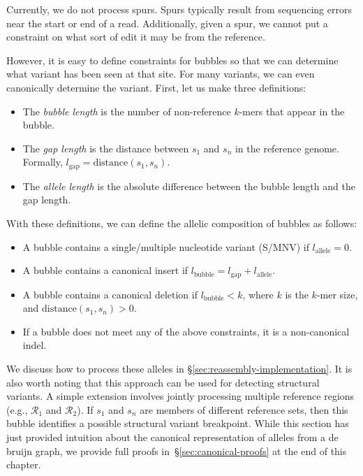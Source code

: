 \documentclass[masters]{ucbthesis}
\begin{document}
Currently, we do not process spurs. Spurs typically result from sequencing errors near the
start or end of a read. Additionally, given a spur, we cannot put a constraint on what sort of
edit it may be from the reference.

However, it is easy to define constraints for bubbles so that we can determine what variant
has been seen at that site. For many variants, we can even canonically determine the variant.
First, let us make three definitions:

\begin{itemize}
\item The \emph{bubble length} is the number of non-reference $k$-mers that appear in the bubble.
\item The \emph{gap length} is the distance between $s_1$ and $s_n$ in the reference genome. Formally,
$l_{\text{gap}} = \text{distance}(s_1, s_n)$.
\item The \emph{allele length} is the absolute difference between the bubble length and the gap length.
\end{itemize}

With these definitions, we can define the allelic composition of bubbles as follows:

\begin{itemize}
\item A bubble contains a single/multiple nucleotide variant (S/MNV) if $l_{\text{allele}} = 0$.
\item A bubble contains a canonical insert if $l_{\text{bubble}} = l_{\text{gap}} + l_{\text{allele}}$.
\item A bubble contains a canonical deletion if $l_{\text{bubble}} < k$, where $k$ is the $k$-mer size,
and $\text{distance}(s_1, s_n) > 0$.
\item If a bubble does not meet any of the above constraints, it is a non-canonical indel.
\end{itemize}

We discuss how to process these alleles in \S\ref{sec:reassembly-implementation}. It
is also worth noting that this approach can be used for detecting structural variants. A simple
extension involves jointly processing multiple reference regions (e.g., $\mathcal{R}_1$ and
$\mathcal{R}_2$). If $s_1$ and $s_n$ are members of different reference sets, then this bubble
identifies a possible structural variant breakpoint. While this section has just provided intuition about the
canonical representation of alleles from a de bruijn graph, we provide full proofs
in~\S\ref{sec:canonical-proofs} at the end of this chapter.
\end{document}
